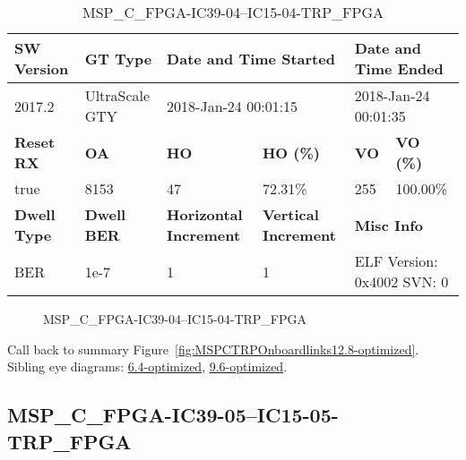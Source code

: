 \begin{table}[h]
\centering
\caption{MSP\_C\_FPGA-IC39-04--IC15-04-TRP\_FPGA}
\label{tab:MSPCFPGAIC3904IC1504TRPFPGA12.8-optimized}
\begin{tabular}{@{}|l|l|l|l|l|l|@{}}
\toprule
\textbf{SW Version}                & \textbf{GT Type}   & \multicolumn{2}{l|}{\textbf{Date and Time Started}}            & \multicolumn{2}{l|}{\textbf{Date and Time Ended}}        \\ \midrule
2017.2                       & UltraScale GTY          & \multicolumn{2}{l|}{2018-Jan-24 00:01:15}                   & \multicolumn{2}{l|}{2018-Jan-24 00:01:35}               \\ \midrule
\textbf{Reset RX}                  & \textbf{OA} & \textbf{HO}   & \textbf{HO (\%)} & \textbf{VO} & \textbf{VO (\%)} \\ \midrule
true & 8153        & 47          & 72.31\%        & 255        & 100.00\%       \\ \midrule
\textbf{Dwell Type}                & \textbf{Dwell BER} & \textbf{Horizontal Increment} & \textbf{Vertical Increment}    & \multicolumn{2}{l|}{\textbf{Misc Info}}                  \\ \midrule
BER                            & 1e-7        & 1        & 1           & \multicolumn{2}{l|}{ELF Version: 0x4002 SVN: 0}                         \\ \bottomrule
\end{tabular}
\end{table}

\begin{figure}[h]
\caption{MSP\_C\_FPGA-IC39-04--IC15-04-TRP\_FPGA} \label{fig:MSPCFPGAIC3904IC1504TRPFPGA12.8-optimized}
\end{figure}

Call back to summary Figure~\ref{fig:MSPCTRPOnboardlinks12.8-optimized}.
Sibling eye diagrams: \hyperref[sec:MSPCFPGAIC3904IC1504TRPFPGA6.4-optimized]{6.4-optimized}, \hyperref[sec:MSPCFPGAIC3904IC1504TRPFPGA9.6-optimized]{9.6-optimized}.

\clearpage
\newpage


\subsection{MSP\_C\_FPGA-IC39-05--IC15-05-TRP\_FPGA}\label{sec:MSPCFPGAIC3905IC1505TRPFPGA12.8-optimized}

